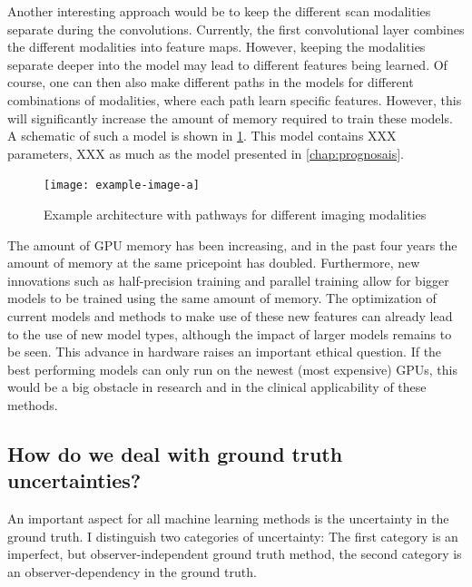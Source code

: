 Another interesting approach would be to keep the different scan modalities separate during the convolutions.
Currently, the first convolutional layer combines the different modalities into feature maps.
However, keeping the modalities separate deeper into the model may lead to different features being learned.
Of course, one can then also make different paths in the models for different combinations of modalities, where each path learn specific features.
However, this will significantly increase the amount of memory required to train these models.
A schematic of such a model is shown in \cref{fig:discussion_architecture}.
This model contains XXX parameters, XXX as much as the model presented in \cref{chap:prognosais}.

\begin{figure}
\texttt{[image: example-image-a]}
\caption{Example architecture with pathways for different imaging modalities}\label{fig:discussion_architecture}
\end{figure}

The amount of GPU memory has been increasing, and in the past four years the amount of memory at the same pricepoint has doubled.
Furthermore, new innovations such as half-precision training and parallel training allow for bigger models to be trained using the same amount of memory.
The optimization of current models and methods to make use of these new features can already lead to the use of new model types, although the impact of larger models remains to be seen.
This advance in hardware raises an important ethical question.
If the best performing models can only run on the newest (most expensive) GPUs, this would be a big obstacle in research and in the clinical applicability of these methods.


\subsection{How do we deal with ground truth uncertainties?}

An important aspect for all machine learning methods is the uncertainty in the ground truth.
I distinguish two categories of uncertainty: The first category is an imperfect, but observer-independent ground truth method, the second category is an observer-dependency in the ground truth.

